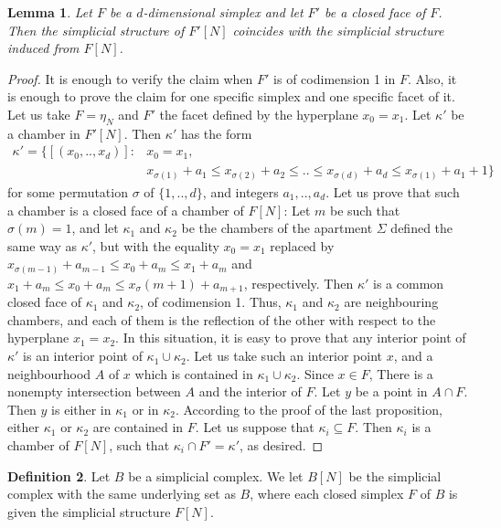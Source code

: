 \documentclass{amsart}
\theoremstyle{theorem}
\theoremstyle{lemma}
\newtheorem{lemma}{Lemma}[section]
\theoremstyle{prop}
\theoremstyle{definition}
\newtheorem{definition}[lemma]{Definition}
\theoremstyle{corollary}
\theoremstyle{remark}
\begin{document}
\begin{lemma}\label{compatible}
Let $F$ be a $d$-dimensional simplex and let $F'$ be a closed face of $F$. Then the simplicial structure of $F'[N]$ coincides with the simplicial structure induced from $F[N]$.
\end{lemma}
\begin{proof}
It is enough to verify the claim when $F'$ is of codimension 1 in $F$. Also, it is enough to prove the claim for one specific simplex and one specific facet of it. Let us take $F = \eta_N$ and $F'$ the facet defined by the hyperplane $x_0=x_1$. Let $\kappa'$ be a chamber in $F'[N]$. Then $\kappa'$ has the form
\begin{equation*}
\begin{split}
\kappa' = \{[(x_0,..,x_d)]:& x_0=x_1, \\
                                     &x_{\sigma(1)} + a_1 \leq x_{\sigma(2)} + a_2 \leq .. \leq x_{\sigma(d)} + a_d \leq x_{\sigma(1)} + a_1 + 1 \} 
\end{split}
\end{equation*}
for some permutation $\sigma$ of $\{1,..,d\}$, and integers $a_1,..,a_d$. 
Let us prove that such a chamber is a closed face of a chamber of $F[N]$: Let $m$ be such that $\sigma(m)=1$, and let $\kappa_1$ and $\kappa_2$ be the chambers of the apartment $\Sigma$ defined the same way as $\kappa'$, but with the equality $x_0=x_1$ replaced by $x_{\sigma(m-1)}+a_{m-1} \leq x_0+a_m \leq x_1 + a_m$ and $x_1+a_m \leq x_0+a_m \leq x_\sigma(m+1)+a_{m+1}$, respectively. Then $\kappa'$ is a common closed face of $\kappa_1$ and $\kappa_2$, of codimension 1. Thus, $\kappa_1$ and $\kappa_2$ are neighbouring chambers, and each of them is the reflection of the other with respect to the hyperplane $x_1=x_2$. In this situation, it is easy to prove that any interior point of $\kappa'$ is an interior point of $\kappa_1 \cup \kappa_2$. Let us take such an interior point $x$, and a neighbourhood $A$ of $x$ which is contained in $\kappa_1 \cup \kappa_2$. Since $x\in F$, There is a nonempty intersection between $A$ and the interior of $F$. Let $y$ be a point in $A \cap F$. Then $y$ is either in $\kappa_1$ or in $\kappa_2$. According to the proof of the last proposition, either $\kappa_1$ or $\kappa_2$ are contained in $F$. Let us suppose that $\kappa_i \subseteq F$. Then $\kappa_i$ is a chamber of $F[N]$, such that $\kappa_i \cap F' = \kappa'$, as desired.
 \end{proof}

\begin{definition} Let $B$ be a simplicial complex. We let $B[N]$ be the simplicial complex with the same underlying set as $B$, where each closed simplex $F$ of $B$ is given the simplicial structure $F[N]$.
 \end{definition}
\end{document}
